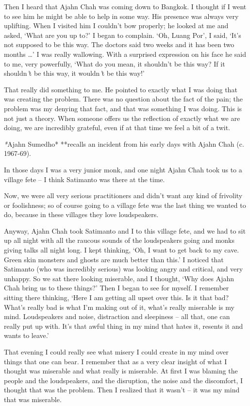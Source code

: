 Then I heard that Ajahn Chah was coming down to Bangkok. I thought if I
went to see him he might be able to help in some way. His presence was
always very uplifting. When I visited him I couldn't bow properly; he
looked at me and asked, `What are you up to?' I began to complain. `Oh, 
Luang Por', I said, `It's not supposed to be this way. The doctors said
two weeks and it has been two months \ldots{}' I was really wallowing. 
With a surprised expression on his face he said to me, very powerfully, 
`What do you mean, it shouldn't be this way? If it shouldn\emph{'}t be
this way, it wouldn\emph{'}t be this way!'

That really did something to me. He pointed to exactly what I was doing
that was creating the problem. There was no question about the fact of
the pain; the problem was my denying that fact, and that was something I
was doing. This is not just a theory. When someone offers us the
reflection of exactly what we are doing, we are incredibly grateful, 
even if at that time we feel a bit of a twit. 

\emph{*}Ajahn Sumedho* **recalls an incident from his early days with
Ajahn Chah (c. 1967-69).

In those days I was a very junior monk, and one night Ajahn Chah took us
to a village fete -- I think Satimanto was there at the time. 

Now, we were all very serious practitioners and didn't want any kind of
frivolity or foolishness; so of course going to a village fete was the
last thing we wanted to do, because in these villages they love
loudspeakers. 

Anyway, Ajahn Chah took Satimanto and I to this village fete, and we had
to sit up all night with all the raucous sounds of the loudspeakers
going and monks giving talks all night long. I kept thinking, `Oh, I
want to get back to my cave. Green skin monsters and ghosts are much
better than this.' I noticed that Satimanto (who was incredibly serious) 
was looking angry and critical, and very unhappy. So we sat there
looking miserable, and I thought, `Why does Ajahn Chah bring us to these
things?' Then I began to see for myself. I remember sitting there
thinking, `Here I am getting all upset over this. Is it that bad? What's
really bad is what I'm making out of it, what's really miserable is my
mind. Loudspeakers and noise, distraction and sleepiness -- all that, 
one can really put up with. It's that awful thing in my mind that hates
it, resents it and wants to leave.'

That evening I could really see what misery I could create in my mind
over things that one can bear. I remember that as a very clear insight
of what I thought was miserable and what really is miserable. At first I
was blaming the people and the loudspeakers, and the disruption, the
noise and the discomfort, I thought that was the problem. Then I
realized that it wasn't -- it was my mind that was miserable. 

